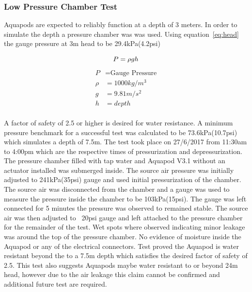 \subsubsection{Low Pressure Chamber Test}
Aquapods are expected to reliably function at a depth of 3 meters. In order to simulate the depth a pressure chamber was was used. Using equation~\ref{eq:head} the gauge pressure at 3m head to be 29.4kPa(4.2psi)

\begin{equation}\label{eq:head}
    P = \rho g h \\
\end{equation}
\begin{align*}
    P & = \text{Gauge Pressure}  \\
    \rho & = 1000 kg/m^3 \\
    g & = 9.81 m/s^2 \\
    h & = depth  \\
\end{align*}

A factor of safety of 2.5 or higher is desired for water resistance. A minimum pressure benchmark for a successful test was calculated to be 73.6kPa(10.7psi) which simulates a depth of 7.5m.
The test took place on 27/6/2017 from 11:30am to 4:00pm which are the respective times of pressurization and depressurization.
The pressure chamber filled with tap water and Aquapod V3.1 without an actuator installed was submerged inside.
The source air pressure was initially adjusted to 241kPa(35psi) gauge and used initial pressurization of the chamber.
The source air was disconnected from the chamber and a gauge was used to measure the pressure inside the chamber to be 103kPa(15psi). 
The gauge was left connected for 5 minutes the pressure was observed to remained stable. 
The source air was then adjusted to ~20psi gauge and left attached to the pressure chamber for the remainder of the test. 
Wet spots where observed indicating minor leakage was around the top of the pressure chamber.
No evidence of moisture inside the Aquapod or any of the electrical connectors. 
Test proved the Aquapod is water resistant beyond the to a 7.5m depth which satisfies the desired factor of safety of 2.5.
This test also suggests Aquapods maybe water resistant to or beyond 24m head, however due to the air leakage this claim cannot be confirmed and additional future test are required.


